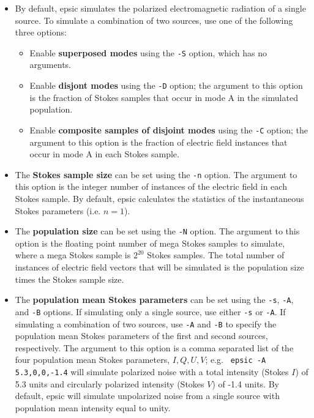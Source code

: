 \documentclass[fullpage]{article}
\begin{document}
\begin{itemize}

\item By default, {\sc epsic} simulates the polarized electromagnetic
  radiation of a single source.  To simulate a combination of two
  sources, use one of the following three options:

  \begin{itemize}
  \item Enable {\bf superposed modes} using the {\tt -S} option, which
    has no arguments.

  \item Enable {\bf disjont modes} using the {\tt -D} option; the argument
    to this option is the fraction of Stokes samples that occur in mode A
    in the simulated population.

  \item Enable {\bf composite samples of disjoint modes} using the
    {\tt -C} option; the argument to this option is the fraction of
    electric field instances that occur in mode A in each Stokes sample.

  \end{itemize}

\item The {\bf Stokes sample size} can be set using the {\tt -n}
  option.  The argument to this option is the integer number of
  instances of the electric field in each Stokes sample.  By default,
  {\sc epsic} calculates the statistics of the instantaneous Stokes
  parameters (i.e. $n=1$).

\item The {\bf population size} can be set using the {\tt -N}
  option.  The argument to this option is the floating point number
  of mega Stokes samples to simulate, where a mega Stokes sample is
  $2^{20}$ Stokes samples.  The total number of instances of electric
  field vectors that will be simulated is the population size times
  the Stokes sample size.
   
\item The {\bf population mean Stokes parameters} can be set using the
  {\tt -s}, {\tt -A}, and {\tt -B} options.  If simulating only a
  single source, use either {\tt -s} or {\tt -A}.  If simulating a
  combination of two sources, use {\tt -A} and {\tt -B} to specify the
  population mean Stokes parameters of the first and second sources,
  respectively.  The argument to this option is a comma separated list
  of the four population mean Stokes parameters, $I,Q,U,V$; e.g.  {\tt
    epsic -A 5.3,0,0,-1.4} will simulate polarized noise with a total
  intensity (Stokes $I$) of 5.3 units and circularly polarized
  intensity (Stokes $V$) of -1.4 units.  By default, {\sc epsic} will
  simulate unpolarized noise from a single source with population mean
  intensity equal to unity.
  

\end{itemize}
\end{document}
